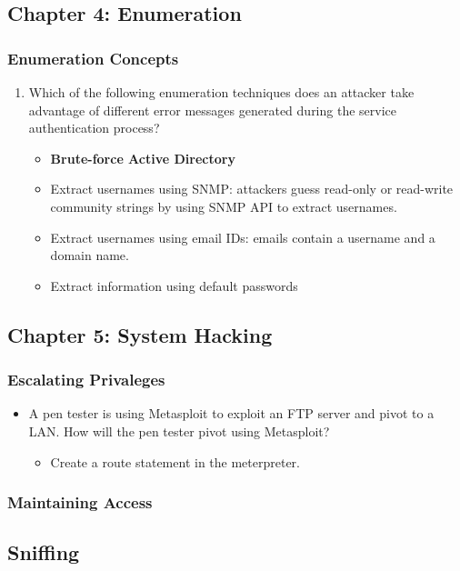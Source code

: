 \subsection{Chapter 4: Enumeration}
\subsubsection{Enumeration Concepts}
\begin{enumerate}
    \item Which of the following enumeration techniques does an attacker take advantage of different error messages generated during the service authentication process?
    \begin{itemize}
        \item \textbf{Brute-force Active Directory}
        \item Extract usernames using SNMP: attackers guess read-only or read-write community strings by using SNMP API to extract usernames.
        \item Extract usernames using email IDs: emails contain a username and a domain name.
        \item Extract information using default passwords
    \end{itemize}
\end{enumerate}

\subsection{Chapter 5: System Hacking}
\subsubsection{Escalating Privaleges}
\begin{itemize}
    \item A pen tester is using Metasploit to exploit an FTP server and pivot to a LAN. How will the pen tester pivot using Metasploit?
    \begin{itemize}
        \item Create a route statement in the meterpreter.
    \end{itemize}
\end{itemize}
\subsubsection{Maintaining Access}


\subsection{Sniffing}
